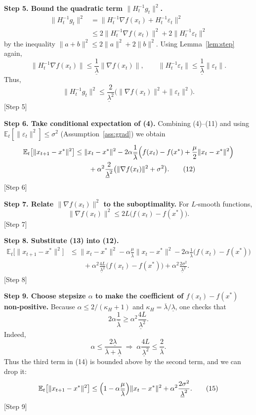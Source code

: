 \documentclass{article}
\begin{document}
\bigskip
\noindent\textbf{Step 5. Bound the quadratic term $\|H_{t}^{-1}g_{t}\|^{2}$.}
\begin{align}
\|H_{t}^{-1}g_{t}\|^{2}
&= \|H_{t}^{-1}\nabla f(x_{t})+H_{t}^{-1}\varepsilon_{t}\|^{2} \nonumber\\
&\le 2\|H_{t}^{-1}\nabla f(x_{t})\|^{2}
   +2\|H_{t}^{-1}\varepsilon_{t}\|^{2} \tag{9}
\end{align}
by the inequality $\|a+b\|^{2}\le2\|a\|^{2}+2\|b\|^{2}$.
Using Lemma~\ref{lem:step} again,
\[
\|H_{t}^{-1}\nabla f(x_{t})\|\le\frac{1}{\underline{\lambda}}\|\nabla f(x_{t})\|,
\qquad
\|H_{t}^{-1}\varepsilon_{t}\|\le\frac{1}{\underline{\lambda}}\|\varepsilon_{t}\|.
\tag{10}
\]
Thus,
\[
\|H_{t}^{-1}g_{t}\|^{2}
\le\frac{2}{\underline{\lambda}^{2}}
\bigl(\|\nabla f(x_{t})\|^{2}+\|\varepsilon_{t}\|^{2}\bigr).
\tag{11}
\]
[Step 5]

\bigskip
\noindent\textbf{Step 6. Take conditional expectation of (4).}
Combining (4)–(11) and using $\mathbb{E}_{t}[\|\varepsilon_{t}\|^{2}]
\le\sigma^{2}$ (Assumption~\ref{ass:grad}) we obtain
\begin{align}
\mathbb{E}_{t}\bigl[\|x_{t+1}-x^{*}\|^{2}\bigr]
&\le \|x_{t}-x^{*}\|^{2}
   -2\alpha\frac{1}{\overline{\lambda}}
     \Bigl(f(x_{t})-f(x^{*})+\frac{\mu}{2}\|x_{t}-x^{*}\|^{2}\Bigr) \nonumber\\
&\qquad
   +\alpha^{2}\frac{2}{\underline{\lambda}^{2}}
     \bigl(\|\nabla f(x_{t})\|^{2}+\sigma^{2}\bigr). \tag{12}
\end{align}
[Step 6]

\bigskip
\noindent\textbf{Step 7. Relate $\|\nabla f(x_{t})\|^{2}$ to the suboptimality.}
For $L$‑smooth functions,
\[
\|\nabla f(x_{t})\|^{2}\le 2L\bigl(f(x_{t})-f(x^{*})\bigr). \tag{13}
\]
[Step 7]

\bigskip
\noindent\textbf{Step 8. Substitute (13) into (12).}
\begin{align}
\mathbb{E}_{t}\bigl[\|x_{t+1}-x^{*}\|^{2}\bigr]
&\le \|x_{t}-x^{*}\|^{2}
   -\alpha\frac{\mu}{\overline{\lambda}}\|x_{t}-x^{*}\|^{2}
   -2\alpha\frac{1}{\overline{\lambda}}\bigl(f(x_{t})-f(x^{*})\bigr) \nonumber\\
&\qquad
   +\alpha^{2}\frac{4L}{\underline{\lambda}^{2}}
     \bigl(f(x_{t})-f(x^{*})\bigr)
   +\alpha^{2}\frac{2\sigma^{2}}{\underline{\lambda}^{2}}. \tag{14}
\end{align}
[Step 8]

\bigskip
\noindent\textbf{Step 9. Choose stepsize $\alpha$ to make the coefficient of
$f(x_{t})-f(x^{*})$ non‑positive.}
Because $\alpha\le 2/(\kappa_{H}+1)$ and $\kappa_{H}=\overline{\lambda}/\underline{\lambda}$,
one checks that
\[
2\alpha\frac{1}{\overline{\lambda}} \ge
\alpha^{2}\frac{4L}{\underline{\lambda}^{2}}.
\]
Indeed,
\[
\alpha\le\frac{2\underline{\lambda}}{\overline{\lambda}+ \underline{\lambda}}
\;\Longrightarrow\;
\alpha\frac{4L}{\underline{\lambda}^{2}}\le
\frac{2}{\overline{\lambda}}.
\]
Thus the third term in (14) is bounded above by the second term, and we can drop it:
\[
\mathbb{E}_{t}\bigl[\|x_{t+1}-x^{*}\|^{2}\bigr]
\le
\Bigl(1-\alpha\frac{\mu}{\overline{\lambda}}\Bigr)\|x_{t}-x^{*}\|^{2}
+\alpha^{2}\frac{2\sigma^{2}}{\underline{\lambda}^{2}}. \tag{15}
\]
[Step 9]
\end{document}
